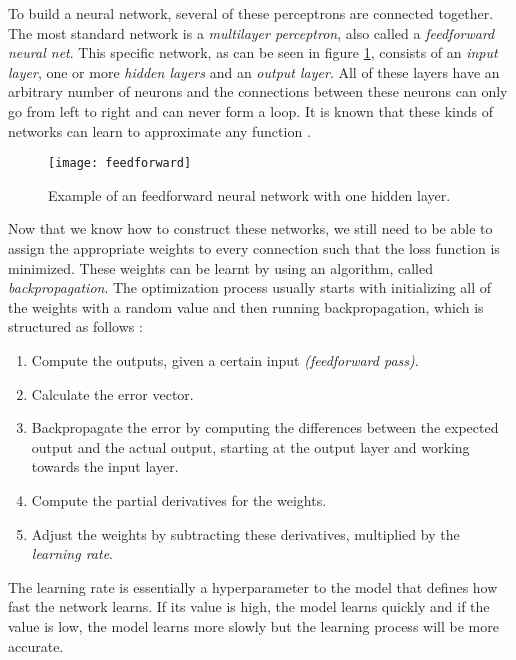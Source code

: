 To build a neural network, several of these perceptrons are connected together.
The most standard network is a \textit{multilayer perceptron}, also called a \textit{feedforward neural net}.
This specific network, as can be seen in figure \ref{fig:feedforward}, consists of an \textit{input layer}, one or more \textit{hidden layers} and an \textit{output layer}.
All of these layers have an arbitrary number of neurons and the connections between these neurons can only go from left to right and can never form a loop.
It is known that these kinds of networks can learn to approximate any function \cite{valiant2014learning}.

\begin{figure}[ht]
  \centering
  \texttt{[image: feedforward]}
  \caption{Example of an feedforward neural network with one hidden layer.}
  \label{fig:feedforward}
\end{figure}

Now that we know how to construct these networks, we still need to be able to assign the appropriate weights to every connection such that the loss function is minimized.
These weights can be learnt by using an algorithm, called \textit{backpropagation}.
The optimization process usually starts with initializing all of the weights with a random value and then running backpropagation, which is structured as follows \cite{nielsen_2017}:

\newpage

\begin{enumerate}
  \item Compute the outputs, given a certain input \textit{(feedforward pass)}.
  \item Calculate the error vector.
  \item Backpropagate the error by computing the differences between the expected output and the actual output, starting at the output layer and working towards the input layer.
  \item Compute the partial derivatives for the weights.
  \item Adjust the weights by subtracting these derivatives, multiplied by the \textit{learning rate}.
\end{enumerate}

The learning rate is essentially a hyperparameter to the model that defines how fast the network learns.
If its value is high, the model learns quickly and if the value is low, the model learns more slowly but the learning process will be more accurate.

